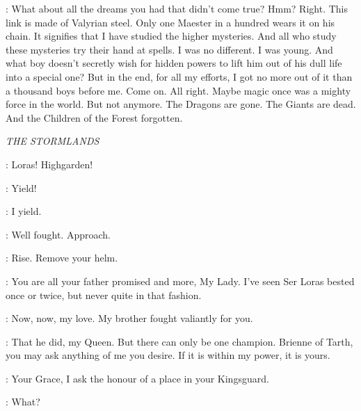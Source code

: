 \LUWIN: What about all the dreams you had that didn't come true? Hmm?  Right. This link is made of Valyrian steel. Only one Maester in a hundred wears it on his chain. It signifies that I have studied the higher mysteries. And all who study these mysteries try their hand at spells. I was no different. I was young. And what boy doesn't secretly wish for hidden powers to lift him out of his dull life into a special one? But in the end, for all my efforts, I got no more out of it than a thousand boys before me. Come on.  All right. Maybe magic once was a mighty force in the world. But not anymore. The Dragons are gone. The Giants are dead. And the Children of the Forest forgotten. 


\scene

\textit{THE STORMLANDS} 


\MARGAERY: Loras! Highgarden! 


\BRIENNE: Yield! 

\LORAS: I yield. 


\RENLY: Well fought. Approach. 


\RENLY: Rise. Remove your helm. 


\RENLY: You are all your father promised and more, My Lady. I've seen Ser Loras bested once or twice, but never quite in that fashion. 

\MARGAERY: Now, now, my love. My brother fought valiantly for you. 

\RENLY: That he did, my Queen. But there can only be one champion. Brienne of Tarth, you may ask anything of me you desire. If it is within my power, it is yours. 

\BRIENNE: Your Grace, I ask the honour of a place in your Kingsguard. 


\LORAS: What? 

